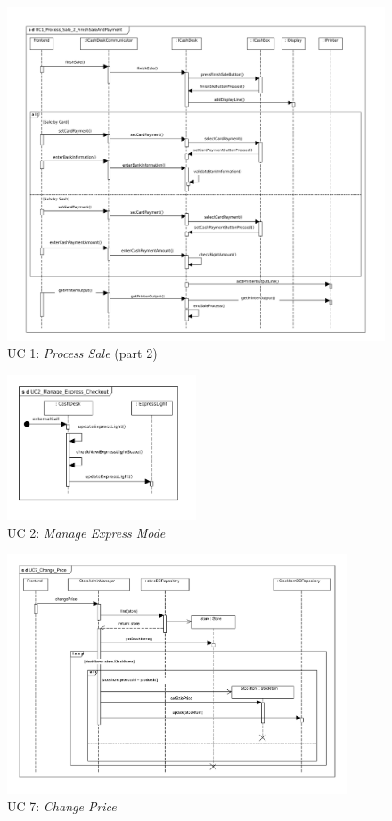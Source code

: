			\begin{figure}[!h]
				\centering
				\includegraphics[width = 1\textwidth]{img/UC1_Process_Sale_2_FinishSaleAndPayment.pdf}
				\caption{UC 1: \textit{Process Sale} (part 2)}
				\label{MS_UC1_2}
			\end{figure}
			
			\begin{figure}[!h]
				\centering
				\includegraphics[width = 0.5\textwidth]{img/UC2_Manage_Express_Checkout.pdf}
				\caption{UC 2: \textit{Manage Express Mode}}
				\label{MS_UC2}
			\end{figure}
			
			\begin{figure}[!h]
				\centering
				\includegraphics[width = 0.9\textwidth]{img/UC7_Change_Price.pdf}
				\caption{UC 7: \textit{Change Price}}
				\label{MS_UC7}
			\end{figure}
			
